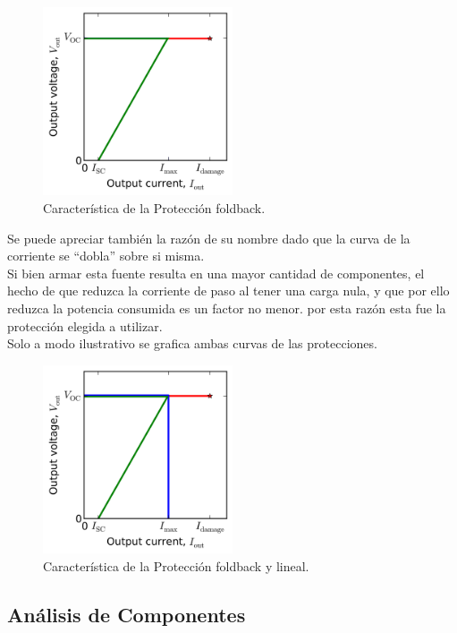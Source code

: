 \begin{figure}[H]
\centering
	\includegraphics[width=0.5\textwidth]{ImagenesEjercicio2/foldbackLineal.png}
	\caption{Característica de la Protección foldback.}
	\label{fig:circuitofoldbackcarac}
\end{figure}
Se puede apreciar también la razón de su nombre dado que la curva de la corriente se ``dobla'' sobre si misma.\\
Si bien armar esta fuente resulta en una mayor cantidad de componentes, el hecho de que reduzca la corriente de paso al tener una carga nula, y que por ello reduzca la potencia consumida es un factor no menor. por esta razón esta fue la protección elegida a utilizar.\\
Solo a modo ilustrativo se grafica ambas curvas de las protecciones.
\begin{figure}[H]
\centering
	\includegraphics[width=0.5\textwidth]{ImagenesEjercicio2/foldback.png}
	\caption{Característica de la Protección foldback y lineal.}
	\label{fig:circuitofoldbacklinealcarac}
\end{figure}
\subsection{Análisis de Componentes}
